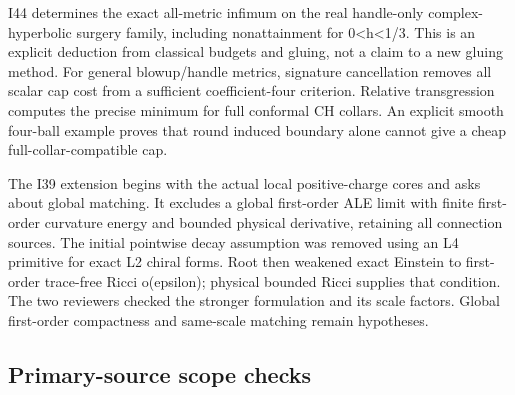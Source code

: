 \documentclass[
  10pt,
]{article}
\begin{document}
I44 determines the exact all-metric infimum on the real handle-only
complex-hyperbolic surgery family, including nonattainment for
0\textless h\textless1/3. This is an explicit deduction from classical
budgets and gluing, not a claim to a new gluing method. For general
blowup/handle metrics, signature cancellation removes all scalar cap
cost from a sufficient coefficient-four criterion. Relative
transgression computes the precise minimum for full conformal CH
collars. An explicit smooth four-ball example proves that round induced
boundary alone cannot give a cheap full-collar-compatible cap.

The I39 extension begins with the actual local positive-charge cores and
asks about global matching. It excludes a global first-order ALE limit
with finite first-order curvature energy and bounded physical
derivative, retaining all connection sources. The initial pointwise
decay assumption was removed using an L4 primitive for exact L2 chiral
forms. Root then weakened exact Einstein to first-order trace-free Ricci
o(epsilon); physical bounded Ricci supplies that condition. The two
reviewers checked the stronger formulation and its scale factors. Global
first-order compactness and same-scale matching remain hypotheses.

\hypertarget{primary-source-scope-checks}{%
\subsection{Primary-source scope
checks}\label{primary-source-scope-checks}}
\end{document}
